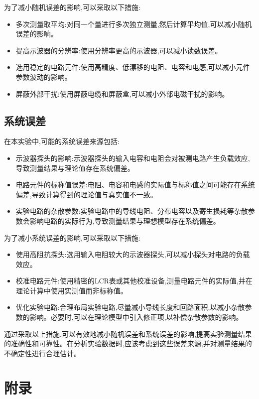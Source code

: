 \documentclass[UTF8]{ctexart}
\begin{document}
为了减小随机误差的影响,可以采取以下措施:
\begin{itemize}
    \item 多次测量取平均:对同一个量进行多次独立测量,然后计算平均值,可以减小随机误差的影响。
    \item 提高示波器的分辨率:使用分辨率更高的示波器,可以减小读数误差。
    \item 选用稳定的电路元件:使用高精度、低漂移的电阻、电容和电感,可以减小元件参数波动的影响。
    \item 屏蔽外部干扰:使用屏蔽电缆和屏蔽盒,可以减小外部电磁干扰的影响。
\end{itemize}

\subsection{系统误差}

在本实验中,可能的系统误差来源包括:

\begin{itemize}
    \item 示波器探头的影响:示波器探头的输入电容和电阻会对被测电路产生负载效应,导致测量结果与理论值存在系统偏差。
    \item 电路元件的标称值误差:电阻、电容和电感的实际值与标称值之间可能存在系统偏差,导致计算得到的理论值与真实值不一致。
    \item 实验电路的杂散参数:实验电路中的导线电阻、分布电容以及寄生损耗等杂散参数会影响电路的实际行为,导致测量结果与理想模型存在系统偏差。
\end{itemize}

为了减小系统误差的影响,可以采取以下措施:
\begin{itemize}
    \item 使用高阻抗探头:选用输入电阻较大的示波器探头,可以减小探头对电路的负载效应。
    \item 校准电路元件:使用精密的LCR表或其他校准设备,测量电路元件的实际值,并在理论计算中使用实测值而非标称值。
    \item 优化实验电路:合理布局实验电路,尽量减小导线长度和回路面积,以减小杂散参数的影响。必要时,可以在理论模型中引入修正项,以补偿杂散参数的影响。
\end{itemize}

通过采取以上措施,可以有效地减小随机误差和系统误差的影响,提高实验测量结果的准确性和可靠性。在分析实验数据时,应该考虑到这些误差来源,并对测量结果的不确定性进行合理估计。


\newpage

\section{附录}
\end{document}
